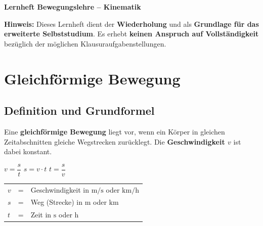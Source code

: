 \documentclass[11pt, a4paper]{article}
\newcommand{\wichtig}[1]{\textcolor{physik}{\textbf{#1}}}
\begin{document}

\begin{center}
    {\Large\textbf{\textcolor{physik}{Lernheft Bewegungslehre -- Kinematik}}}
\end{center}

\vspace{0.5em}

\begin{tcolorbox}[colback=white, colframe=red!70!black, boxrule=1.5pt, arc=2pt, left=8pt, right=8pt, top=6pt, bottom=6pt]
\textcolor{red!70!black}{\textbf{Hinweis:}} Dieses Lernheft dient der \textbf{Wiederholung} und als \textbf{Grundlage für das erweiterte Selbststudium}. Es erhebt \textbf{keinen Anspruch auf Vollständigkeit} bezüglich der möglichen Klausuraufgabenstellungen.
\end{tcolorbox}

\vspace{0.5em}

\tableofcontents

\vspace{1em}


\section{Gleichförmige Bewegung}

\subsection{Definition und Grundformel}

\begin{merksatz}
Eine \wichtig{gleichförmige Bewegung} liegt vor, wenn ein Körper in gleichen Zeitabschnitten gleiche Wegstrecken zurücklegt. Die \wichtig{Geschwindigkeit $v$} ist dabei konstant.
\end{merksatz}

\begin{formelbox}[title=Grundformel der gleichförmigen Bewegung]
\begin{center}
{\Large $v = \dfrac{s}{t}$ \hspace{2cm} $s = v \cdot t$ \hspace{2cm} $t = \dfrac{s}{v}$}
\end{center}
\vspace{0.3em}
\begin{tabular}{lll}
$v$ & = & Geschwindigkeit in $\si{\metre\per\second}$ oder $\si{\kilo\metre\per\hour}$ \\
$s$ & = & Weg (Strecke) in $\si{\metre}$ oder $\si{\kilo\metre}$ \\
$t$ & = & Zeit in $\si{\second}$ oder $\si{\hour}$ \\
\end{tabular}
\end{formelbox}
\end{document}
